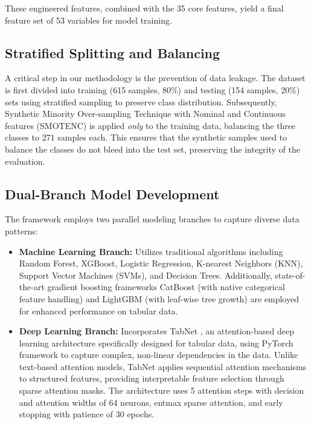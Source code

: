 These engineered features, combined with the 35 core features, yield a final feature set of 53 variables for model training.

\subsection{Stratified Splitting and Balancing}
A critical step in our methodology is the prevention of data leakage. The dataset is first divided into training (615 samples, 80\%) and testing (154 samples, 20\%) sets using stratified sampling to preserve class distribution. Subsequently, Synthetic Minority Over-sampling Technique with Nominal and Continuous features (SMOTENC) is applied \textit{only} to the training data, balancing the three classes to 271 samples each. This ensures that the synthetic samples used to balance the classes do not bleed into the test set, preserving the integrity of the evaluation.

\subsection{Dual-Branch Model Development}
The framework employs two parallel modeling branches to capture diverse data patterns:
\begin{itemize}
    \item \textbf{Machine Learning Branch:} Utilizes traditional algorithms including Random Forest, XGBoost, Logistic Regression, K-nearest Neighbors (KNN), Support Vector Machines (SVMs), and Decision Trees. Additionally, state-of-the-art gradient boosting frameworks CatBoost (with native categorical feature handling) and LightGBM (with leaf-wise tree growth) are employed for enhanced performance on tabular data.
    
    \item \textbf{Deep Learning Branch:} Incorporates TabNet \cite{Arik2021}, an attention-based deep learning architecture specifically designed for tabular data, using PyTorch framework to capture complex, non-linear dependencies in the data. Unlike text-based attention models, TabNet applies sequential attention mechanisms to structured features, providing interpretable feature selection through sparse attention masks. The architecture uses 5 attention steps with decision and attention widths of 64 neurons, entmax sparse attention, and early stopping with patience of 30 epochs.
\end{itemize}

